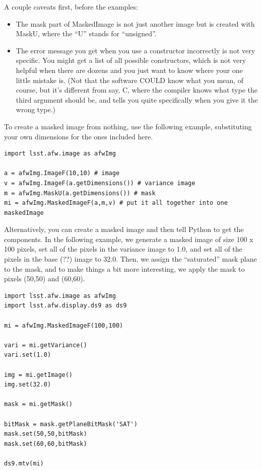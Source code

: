 A couple caveats first, before the examples:
\begin{itemize}
\item The mask part of MaskedImage is not just another image but
is created with MaskU, where the ``U'' stands for ``unsigned''.
\item The error message you get when you use a constructor
incorrectly is not very specific.  You might get a list of all
possible constructors, which is not very helpful when there
are dozens and you just want to know where your one little mistake
is.  (Not that the software COULD know what you mean, of course,
but it's different from say, C, where the compiler knows what type
the third argument should be, and tells you quite specifically when you
give it the wrong type.)
\end{itemize}

To create a masked image from nothing, use the following example, substituting your own dimensions for the ones included here.

\begin{verbatim}
import lsst.afw.image as afwImg

a = afwImg.ImageF(10,10) # image
v = afwImg.ImageF(a.getDimensions()) # variance image
m = afwImg.MaskU(a.getDimensions()) # mask
mi = afwImg.MaskedImageF(a,m,v) # put it all together into one maskedImage
\end{verbatim}

Alternatively, you can create a masked image and then tell Python to get the components.  In the following example, we generate a masked image of size 100 x 100 pixels, set all of the pixels in the variance image to 1.0, and set all of the pixels in the base (??) image to 32.0.  Then, we assign the ``saturated'' mask plane to the mask, and to make things a bit more interesting, we apply the mask to pixels (50,50) and (60,60).  

\begin{verbatim}
import lsst.afw.image as afwImg
import lsst.afw.display.ds9 as ds9

mi = afwImg.MaskedImageF(100,100)

vari = mi.getVariance()
vari.set(1.0)

img = mi.getImage()
img.set(32.0)

mask = mi.getMask()

bitMask = mask.getPlaneBitMask('SAT')
mask.set(50,50,bitMask)
mask.set(60,60,bitMask)

ds9.mtv(mi)
\end{verbatim}

